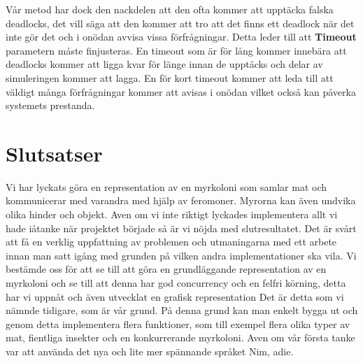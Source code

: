 \documentclass[12pt]{article}
\begin{document}
Vår metod har dock den nackdelen att den ofta kommer att upptäcka falska deadlocks,
det vill säga att den kommer att tro att det finns ett deadlock när det inte gör det och i onödan avvisa vissa förfrågningar.
Detta leder till att \textbf{Timeout} parametern måste finjusteras.
En timeout som är för lång kommer innebära att deadlocks kommer att ligga kvar för länge innan de upptäcks och delar av simuleringen kommer att lagga.
En för kort timeout kommer att leda till att väldigt många förfrågningar kommer att avisas i onödan vilket också kan påverka systemets prestanda.

\section{Slutsatser}
Vi har lyckats göra en representation av en myrkoloni som samlar mat och kommunicerar med varandra med hjälp av feromoner.
Myrorna kan även undvika olika hinder och objekt.
Aven om vi inte riktigt lyckades implementera allt vi hade iåtanke när projektet började så är vi nöjda med slutresultatet.
Det är svårt att få en verklig uppfattning av problemen och utmaningarna med ett arbete innan man satt igång med grunden på vilken andra implementationer ska vila.
Vi bestämde oss för att se till att göra en grundläggande representation av en myrkoloni och se till att denna har god concurrency och en felfri körning,
detta har vi uppnåt och även utvecklat en grafisk representation Det är detta som vi nämnde tidigare, som är vår grund.
På denna grund kan man enkelt bygga ut och genom detta implementera flera funktioner,
som till exempel flera olika typer av mat, fientliga insekter och en konkurrerande myrkoloni.
Aven om vår första tanke var att använda det nya och lite mer spännande språket Nim,
adie.



\end{document}

